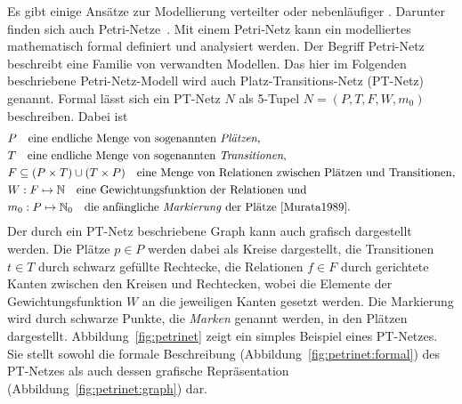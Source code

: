 Es gibt einige Ansätze zur Modellierung verteilter oder nebenläufiger . Darunter finden sich auch Petri-Netze~\cite{Murata1989}. Mit einem Petri-Netz kann ein modelliertes  mathematisch formal definiert und analysiert werden. Der Begriff Petri-Netz beschreibt eine Familie von verwandten Modellen. Das hier im Folgenden beschriebene Petri-Netz-Modell wird auch Platz-Transitions-Netz (PT-Netz) genannt. Formal lässt sich ein PT-Netz $N$ als 5-Tupel $ N=(P,T,F,W,m_0)$ beschreiben. Dabei ist 
\begin{align*}
	&P  \quad \text{eine endliche Menge von sogenannten \emph{Plätzen},}\\
	&T  \quad \text{eine endliche Menge von sogenannten \emph{Transitionen},}\\
	&F \subseteq (P\times T) \cup (T \times P) \quad \text{eine Menge von Relationen zwischen Plätzen und Transitionen,}\\
	&W: F \mapsto \mathbb{N}  \quad \text{eine Gewichtungsfunktion der Relationen und}\\
	&m_0: P \mapsto \mathbb{N}_0   \quad \text{die anfängliche \emph{Markierung} der Plätze~\cite{Murata1989}.}
\end{align*}
Der durch ein PT-Netz beschriebene Graph kann auch grafisch dargestellt werden. Die Plätze $p \in P$ werden dabei als Kreise dargestellt, die Transitionen $ t \in T$ durch schwarz gefüllte Rechtecke, die Relationen $ f \in F$ durch gerichtete Kanten zwischen den Kreisen und Rechtecken, wobei die Elemente der Gewichtungsfunktion $W$ an die jeweiligen Kanten gesetzt werden. Die Markierung wird durch schwarze Punkte, die \emph{Marken} genannt werden, in den Plätzen dargestellt. Abbildung~\ref{fig:petrinet} zeigt ein simples Beispiel eines PT-Netzes. Sie stellt sowohl die formale Beschreibung (Abbildung~\ref{fig:petrinet:formal}) des PT-Netzes als auch dessen grafische Repräsentation (Abbildung~\ref{fig:petrinet:graph}) dar.
